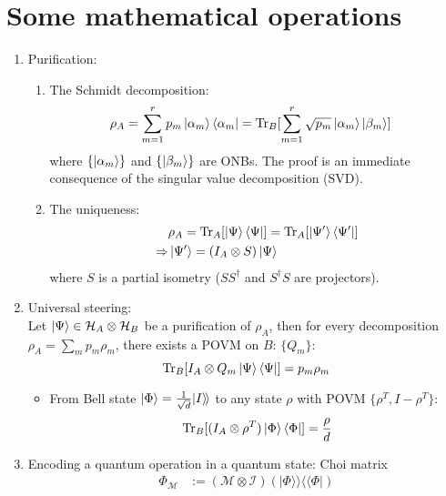 \documentclass[11pt,a4paper]{article}%
\numberwithin{equation}{section}
\newcommand\kk{\rangle\!\rangle}
\newcommand\bb{\langle\!\langle}
\newcommand{\Tr}{\operatorname{Tr}}
\begin{document}
\section{Some mathematical operations} %
\label{sec:some_mathematical_operations}
\begin{enumerate}
    \item Purification:\\
    \begin{enumerate}
        \item The Schmidt decomposition:  
        \begin{align}
            \rho_A &= \sum_{m=1}^r p_m\ket{\alpha_m}\bra{\alpha_m} = \Tr_B[\sum_{m=1}^r\sqrt{p_m}\ket{\alpha_m}\ket{\beta_m}]
        \end{align}
        where $\{\ket{\alpha_m}\}$ and $\{\ket{\beta_m}\}$ are ONBs. The proof is an immediate consequence of the singular value decomposition (SVD).
        \item The uniqueness:
        \begin{align}
            &\rho_A = \Tr_A[\ket\Psi\bra\Psi] = \Tr_A[\ket{\Psi'}\bra{\Psi'}] \\
            \Rightarrow & \ket{\Psi'} = (I_A\otimes S)\ket\Psi
        \end{align}
        where $S$ is a partial isometry ($SS^\dagger$ and $S^\dagger S$ are projectors).
    \end{enumerate}
    \item Universal steering:\\
    Let $\ket\Psi\in\mathcal H_A\otimes\mathcal H_B$ be a purification of $\rho_A$, then for every decomposition $\rho_A = \sum_m p_m\rho_m$, there exists a POVM on $B$: $\{Q_m\}$:
    \begin{equation}
        \Tr_B[I_A\otimes Q_m\ket\Psi\bra\Psi] = p_m\rho_m
    \end{equation}
    \begin{itemize}
        \item From Bell state $\ket\Phi = \frac 1{\sqrt d}|I\kk$ to any state $\rho$ with POVM $\{\rho^T, I-\rho^T\}$:
        \begin{equation}
             \Tr_B[(I_A\otimes\rho^T)\ket\Phi\bra\Phi] = \frac\rho d
        \end{equation} 
    \end{itemize}
    \item Encoding a quantum operation in a quantum state: Choi matrix
    \begin{align}
        \Phi_{\mathscr M} &:= (\mathscr M\otimes \mathscr I)(|\Phi\kk\bb\Phi|) \\

\end{align}
\end{enumerate}
\end{document}
